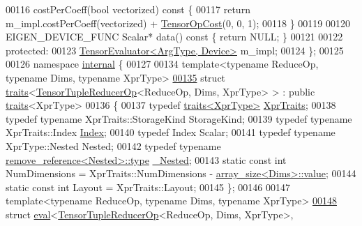 \begin{DoxyCode}
00116   costPerCoeff(\textcolor{keywordtype}{bool} vectorized)\textcolor{keyword}{ const }\{
00117     \textcolor{keywordflow}{return} m\_impl.costPerCoeff(vectorized) + \hyperlink{class_eigen_1_1_tensor_op_cost}{TensorOpCost}(0, 0, 1);
00118   \}
00119 
00120   EIGEN\_DEVICE\_FUNC Scalar* data()\textcolor{keyword}{ const }\{ \textcolor{keywordflow}{return} NULL; \}
00121 
00122  \textcolor{keyword}{protected}:
00123   \hyperlink{struct_eigen_1_1_tensor_evaluator}{TensorEvaluator<ArgType, Device>} m\_impl;
00124 \};
00125 
00126 \textcolor{keyword}{namespace }\hyperlink{namespaceinternal}{internal} \{
00127 
00134 \textcolor{keyword}{template}<\textcolor{keyword}{typename} ReduceOp, \textcolor{keyword}{typename} Dims, \textcolor{keyword}{typename} XprType>
\hyperlink{struct_eigen_1_1internal_1_1traits_3_01_tensor_tuple_reducer_op_3_01_reduce_op_00_01_dims_00_01_xpr_type_01_4_01_4}{00135} \textcolor{keyword}{struct }\hyperlink{struct_eigen_1_1internal_1_1traits}{traits}<\hyperlink{class_eigen_1_1_tensor_tuple_reducer_op}{TensorTupleReducerOp}<ReduceOp, Dims, XprType> > : \textcolor{keyword}{public} 
      \hyperlink{struct_eigen_1_1internal_1_1traits}{traits}<XprType>
00136 \{
00137   \textcolor{keyword}{typedef} \hyperlink{struct_eigen_1_1internal_1_1traits}{traits<XprType>} \hyperlink{struct_eigen_1_1internal_1_1traits}{XprTraits};
00138   \textcolor{keyword}{typedef} \textcolor{keyword}{typename} XprTraits::StorageKind StorageKind;
00139   \textcolor{keyword}{typedef} \textcolor{keyword}{typename} XprTraits::Index \hyperlink{namespace_eigen_a62e77e0933482dafde8fe197d9a2cfde}{Index};
00140   \textcolor{keyword}{typedef} Index Scalar;
00141   \textcolor{keyword}{typedef} \textcolor{keyword}{typename} XprType::Nested Nested;
00142   \textcolor{keyword}{typedef} \textcolor{keyword}{typename} \hyperlink{group___sparse_core___module}{remove\_reference<Nested>::type} 
      \hyperlink{group___sparse_core___module}{\_Nested};
00143   \textcolor{keyword}{static} \textcolor{keyword}{const} \textcolor{keywordtype}{int} NumDimensions = XprTraits::NumDimensions - 
      \hyperlink{struct_eigen_1_1internal_1_1array__size}{array\_size<Dims>::value};
00144   \textcolor{keyword}{static} \textcolor{keyword}{const} \textcolor{keywordtype}{int} Layout = XprTraits::Layout;
00145 \};
00146 
00147 \textcolor{keyword}{template}<\textcolor{keyword}{typename} ReduceOp, \textcolor{keyword}{typename} Dims, \textcolor{keyword}{typename} XprType>
\hyperlink{struct_eigen_1_1internal_1_1eval_3_01_tensor_tuple_reducer_op_3_01_reduce_op_00_01_dims_00_01_xpfa3431995abe939b85159a164be4ee8a}{00148} \textcolor{keyword}{struct }\hyperlink{struct_eigen_1_1internal_1_1eval}{eval}<\hyperlink{class_eigen_1_1_tensor_tuple_reducer_op}{TensorTupleReducerOp}<ReduceOp, Dims, XprType>, 

\end{DoxyCode}
